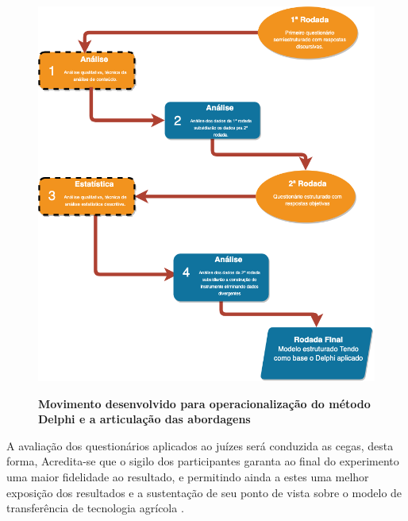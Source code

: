 \begin{figure}[H]
\centering
\caption{\textbf{Movimento desenvolvido para operacionalização do método Delphi e a articulação das
abordagens}}
\includegraphics[scale=0.3]{Imagens/delphi.png}
\label{figura_delphi}
\end{figure}


A avaliação dos questionários aplicados ao  juízes será conduzida as cegas, desta forma, Acredita-se que o sigilo dos participantes garanta ao final do experimento uma maior fidelidade ao resultado, e permitindo ainda a estes uma melhor exposição dos resultados e a sustentação de seu ponto de vista sobre o modelo de transferência de tecnologia agrícola \cite{keeney_delphi_2011}.










